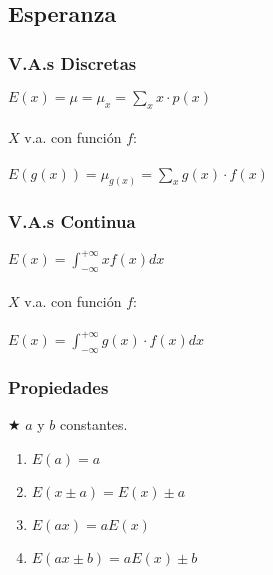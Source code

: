 \documentclass[10pt,letterpaper]{article}
\begin{document}
\subsection{Esperanza}
\begin{multicols}{3}
\subsubsection{V.A.s Discretas}
$E(x)=\mu=\mu_x=\displaystyle\sum_x x\cdot p(x)$ \\ \vspace{0.05cm} \\
$X$ v.a. con función $f$: \\ \vspace{0.05cm} \\
$E(g(x))=\mu_{g(x)}=\displaystyle\sum_x g(x)\cdot f(x)$
\columnbreak
\subsubsection{V.A.s Continua}
$E(x)=\displaystyle\int_{-\infty}^{+\infty} xf(x) dx$\\ \vspace{0.05cm} \\
$X$ v.a. con función $f$: \\ \vspace{0.05cm} \\
$E(x)=\displaystyle\int_{-\infty}^{+\infty} g(x)\cdot f(x) dx$
\columnbreak
\subsubsection{Propiedades}
$\bigstar$ {\scriptsize $a$ y $b$ constantes.}
\begin{enumerate}
\item $E(a)=a$
\item $E(x\pm a)=E(x)\pm a$
\item $E(ax)=aE(x)$
\item $E(ax\pm b)=aE(x)\pm b$
\end{enumerate}
\end{multicols}
\end{document}
